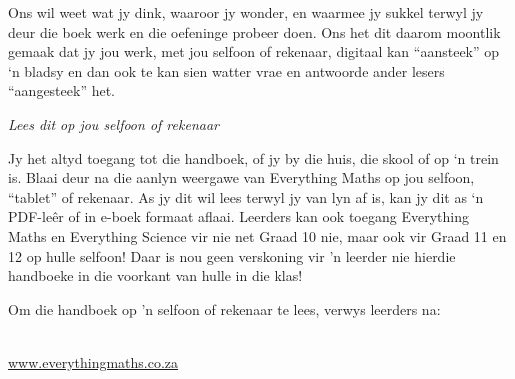 {Ons wil weet wat jy dink, waaroor jy wonder, en waarmee jy sukkel terwyl jy deur die boek werk en die oefeninge probeer doen. Ons het dit daarom moontlik gemaak dat jy jou werk, met jou selfoon of rekenaar, digitaal kan “aansteek” op ‘n bladsy en dan ook te kan sien watter vrae en antwoorde ander lesers “aangesteek” het. \par



}




\newpage
\thispagestyle{empty}

{\normalfont\sffamily\fontsize{22}\normalfont\itshape Lees dit op jou selfoon of rekenaar} \par

{\Large


Jy het altyd toegang tot die handboek, of jy by die huis, die skool of op ‘n trein is. Blaai deur na die aanlyn weergawe van Everything Maths op jou selfoon, “tablet” of rekenaar. As jy dit wil lees terwyl jy van lyn af is, kan jy dit as ‘n PDF-leêr of in e-boek formaat aflaai. Leerders kan ook toegang Everything Maths en Everything Science vir nie net Graad 10 nie, maar ook vir Graad 11 en 12 op hulle selfoon! Daar is nou geen verskoning vir 'n leerder nie hierdie handboeke in die voorkant van hulle in die klas!\par

Om die handboek op 'n selfoon of rekenaar te lees, verwys leerders na: 

 \\ \underline{www.everythingmaths.co.za}} \vspace*{2cm}






